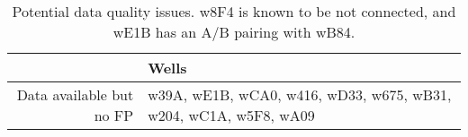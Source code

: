 \begin{table}[ht]
\centering
\begin{tabular}{rl}
  \hline
 & Wells \\ 
  \hline
Data available but no FP & w39A, wE1B, wCA0, w416, wD33, w675, wB31, w204, wC1A, w5F8, wA09 \\ 
   \hline
\end{tabular}
\caption{Potential data quality issues. w8F4 is known to be not connected, and wE1B has an A/B pairing with wB84.} 
\label{tab:quality}
\end{table}
